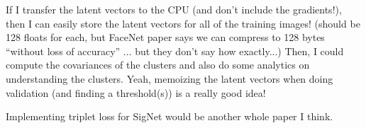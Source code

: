 If I transfer the latent vectors to the CPU (and don't include the gradients!), then I can easily store the latent vectors for all of the training images!
(should be 128 floats for each, but FaceNet paper says we can compress to 128 bytes ``without loss of accuracy'' ... but they don't say how exactly...)
Then, I could compute the covariances of the clusters and also do some analytics on understanding the clusters.
Yeah, memoizing the latent vectors when doing validation (and finding a threshold(s)) is a really good idea!

Implementing triplet loss for SigNet would be another whole paper I think.
